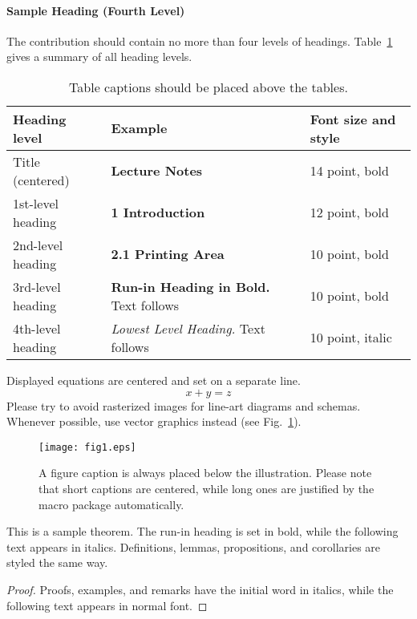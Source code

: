 \documentclass[runningheads]{llncs}
\begin{document}
\paragraph{Sample Heading (Fourth Level)}
The contribution should contain no more than four levels of
headings. Table~\ref{tab1} gives a summary of all heading levels.

\begin{table}
\caption{Table captions should be placed above the
tables.}\label{tab1}
\begin{tabular}{|l|l|l|}
\hline
Heading level &  Example & Font size and style\\
\hline
Title (centered) &  {\Large\bfseries Lecture Notes} & 14 point, bold\\
1st-level heading &  {\large\bfseries 1 Introduction} & 12 point, bold\\
2nd-level heading & {\bfseries 2.1 Printing Area} & 10 point, bold\\
3rd-level heading & {\bfseries Run-in Heading in Bold.} Text follows & 10 point, bold\\
4th-level heading & {\itshape Lowest Level Heading.} Text follows & 10 point, italic\\
\hline
\end{tabular}
\end{table}


\noindent Displayed equations are centered and set on a separate
line.
\begin{equation}
x + y = z
\end{equation}
Please try to avoid rasterized images for line-art diagrams and
schemas. Whenever possible, use vector graphics instead (see
Fig.~\ref{fig1}).

\begin{figure}
\texttt{[image: fig1.eps]}
\caption{A figure caption is always placed below the illustration.
Please note that short captions are centered, while long ones are
justified by the macro package automatically.} \label{fig1}
\end{figure}
\fi

\begin{theorem}
This is a sample theorem. The run-in heading is set in bold, while
the following text appears in italics. Definitions, lemmas,
propositions, and corollaries are styled the same way.
\end{theorem}
%
%
\begin{proof}
Proofs, examples, and remarks have the initial word in italics,
while the following text appears in normal font.
\end{proof}
\end{document}
